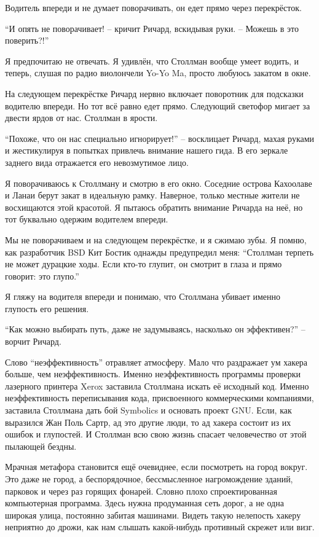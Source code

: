 Водитель впереди и не думает поворачивать, он едет прямо через перекрёсток.

\enquote{И опять не поворачивает! -- кричит Ричард, вскидывая руки. -- Можешь в это поверить?!}

Я предпочитаю не отвечать. Я удивлён, что Столлман вообще умеет водить, и теперь, слушая по радио виолончели Yo-Yo Ma, просто любуюсь закатом в окне.

На следующем перекрёстке Ричард нервно включает поворотник для подсказки водителю впереди. Но тот всё равно едет прямо. Следующий светофор мигает за двести ярдов от нас. Столлман в ярости.

\enquote{Похоже, что он нас специально игнорирует!} -- восклицает Ричард, махая руками и жестикулируя в попытках привлечь внимание нашего гида. В его зеркале заднего вида отражается его невозмутимое лицо.

Я поворачиваюсь к Столлману и смотрю в его окно. Соседние острова Кахоолаве и Ланаи берут закат в идеальную рамку. Наверное, только местные жители не восхищаются этой красотой. Я пытаюсь обратить внимание Ричарда на неё, но тот буквально одержим водителем впереди.

Мы не поворачиваем и на следующем перекрёстке, и я сжимаю зубы. Я помню, как разработчик BSD Кит Бостик однажды предупредил меня: \enquote{Столлман терпеть не может дурацкие ходы. Если кто-то глупит, он смотрит в глаза и прямо говорит: это глупо.\hspace{0.01in}}

Я гляжу на водителя впереди и понимаю, что Столлмана убивает именно глупость его решения.

\enquote{Как можно выбирать путь, даже не задумываясь, насколько он эффективен?} -- ворчит Ричард.

Слово \enquote{неэффективность} отравляет атмосферу. Мало что раздражает ум хакера больше, чем неэффективность. Именно неэффективность программы проверки лазерного принтера Xerox заставила Столлмана искать её исходный код. Именно неэффективность переписывания кода, присвоенного коммерческими компаниями, заставила Столлмана дать бой Symbolics и основать проект GNU. Если, как выразился Жан Поль Сартр, ад это другие люди, то ад хакера состоит из их ошибок и глупостей. И Столлман всю свою жизнь спасает человечество от этой пылающей бездны.

Мрачная метафора становится ещё очевиднее, если посмотреть на город вокруг. Это даже не город, а беспорядочное, бессмысленное нагромождение зданий, парковок и через раз горящих фонарей. Словно плохо спроектированная компьютерная программа. Здесь нужна продуманная сеть дорог, а не одна широкая улица, постоянно забитая машинами. Видеть такую нелепость хакеру неприятно до дрожи, как нам слышать какой-нибудь противный скрежет или визг.

